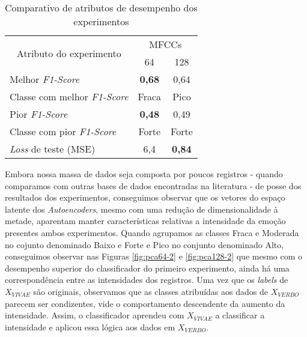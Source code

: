 \begin{table}[!h]
    \centering
    \begin{tabular}{|l|cc|}
        \hline
        \multicolumn{1}{|c|}{\multirow{2}{*}{Atributo do experimento}} & \multicolumn{2}{c|}{MFCCs}         \\ \cline{2-3} 
        \multicolumn{1}{|c|}{}                                         & \multicolumn{1}{c|}{64}    & 128   \\ \hline
        Melhor \textit{F1-Score}                                                & \multicolumn{1}{c|}{\textbf{0,68}}  & 0,64  \\ \hline
        Classe com melhor \textit{F1-Score}                                     & \multicolumn{1}{c|}{Fraca} & Pico  \\ \hline
        Pior \textit{F1-Score}                                                  & \multicolumn{1}{c|}{\textbf{0,48}}  & 0,49  \\ \hline
        Classe com pior \textit{F1-Score}                                       & \multicolumn{1}{c|}{Forte} & Forte \\ \hline
        \textit{Loss} de teste (MSE)                                            & \multicolumn{1}{c|}{6,4}   & \textbf{0,84}  \\ \hline
    \end{tabular}
    \caption{\label{table:compexp}Comparativo de atributos de desempenho dos experimentos}
\end{table}

Embora nossa massa de dados seja composta por poucos registros - quando comparamos com outras bases de dados encontradas na literatura - de posse dos resultados dos experimentos, conseguimos observar que os vetores do espaço latente dos \textit{Autoencoders}, mesmo com uma redução de dimensionalidade à metade, aparentam manter características relativas a intensidade da emoção presentes ambos experimentos. Quando agrupamos as classes Fraca e Moderada no cojunto denominado Baixo e Forte e Pico no conjunto denominado Alto, conseguimos observar nas Figuras \ref{fig:pca64-2} e \ref{fig:pca128-2} que mesmo com o desempenho superior do classificador do primeiro experimento, ainda há uma correspondência entre as intensidades dos registros. Uma vez que os \textit{labels} de $X_{VIVAE}$ são originais, observamos que as classes atribuídas aos dados de $X_{VERBO}$ parecem ser condizentes, vide o comportamento descendente da aumento da intensidade. Assim, o classificador aprendeu com $X_{VIVAE}$ a classificar a intensidade e aplicou essa lógica aos dados em $X_{VERBO}$.
